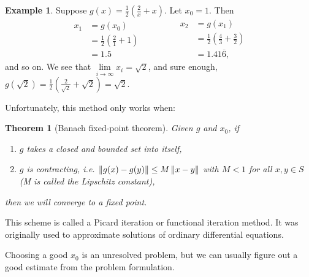 \documentclass[12pt,letterpaper,DIV=11]{scrartcl}
\theoremstyle{plain}
\newtheorem{theorem}{Theorem}[section]
\theoremstyle{definition}
\newtheorem{example}{Example}[section]
\theoremstyle{remark}
\begin{document}
\begin{example}
  Suppose $g(x) = \frac{1}{2} \left( \frac{2}{x} + x \right)$.
  Let $x_0 = 1$.
  Then \begin{displaymath}
    \begin{aligned}
      x_1 &= g(x_0)  \\
          &= \frac{1}{2} \left( \frac{2}{1} + 1 \right) \\
          &= 1.5
    \end{aligned}
    \qquad\qquad
    \begin{aligned}
      x_2 &= g(x_1) \\
          &= \frac{1}{2} \left( \frac{4}{3} + \frac{3}{2} \right) \\
          &= 1.41\overline{6},
    \end{aligned}
  \end{displaymath} and so on.
  We see that $\lim\limits_{i \to \infty} x_i = \sqrt{2}$, and sure enough,
  $g(\sqrt{2}) = \frac{1}{2} \left( \frac{2}{\sqrt{2}} + \sqrt{2} \right) = \sqrt{2}$.
\end{example}
Unfortunately, this method only works when:
\begin{theorem}[Banach fixed-point theorem]\label{thm:banachfpt}
  Given $g$ and $x_0$, if \begin{enumerate}
    \item $g$ takes a closed and bounded set into itself,
    \item $g$ is contracting, i.e. $\left\lVert g(x) - g(y)\right\rVert \leq M \left\lVert x - y\right\rVert$ with $M < 1$ for all $x, y \in S$ (M is called the Lipschitz constant),
  \end{enumerate}
  then we will converge to a fixed point.
\end{theorem}
This scheme is called a Picard iteration or functional iteration method.
It was originally used to approximate solutions of ordinary differential equations.

Choosing a good $x_0$ is an unresolved problem, but we can usually figure out a good estimate from the problem formulation.
\end{document}
